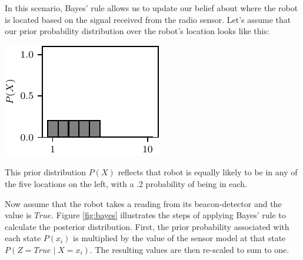In this scenario, Bayes' rule allows us to update our belief about
where the robot is located based on the signal received from the radio
sensor. Let's assume that our prior probability distribution over the
robot's location looks like this:
\begin{center}
\includegraphics[]{probability/figs/left_hist.pdf}
\end{center}
This prior distribution $P(X)$ reflects that robot is equally likely
to be in any of the five locations on the left, with a .2 probability
of being in each.

Now assume that the robot takes a reading from its beacon-detector and the
value is $True$. Figure \ref{fig:bayes} illustrates the steps of
applying Bayes' rule to calculate the posterior distribution.  First,
the prior probability associated with each state $P(x_i)$ is
multiplied by the value of the sensor model at that state $P(Z = True
\mid X = x_i)$.  The resulting values are then re-scaled to sum to one.

